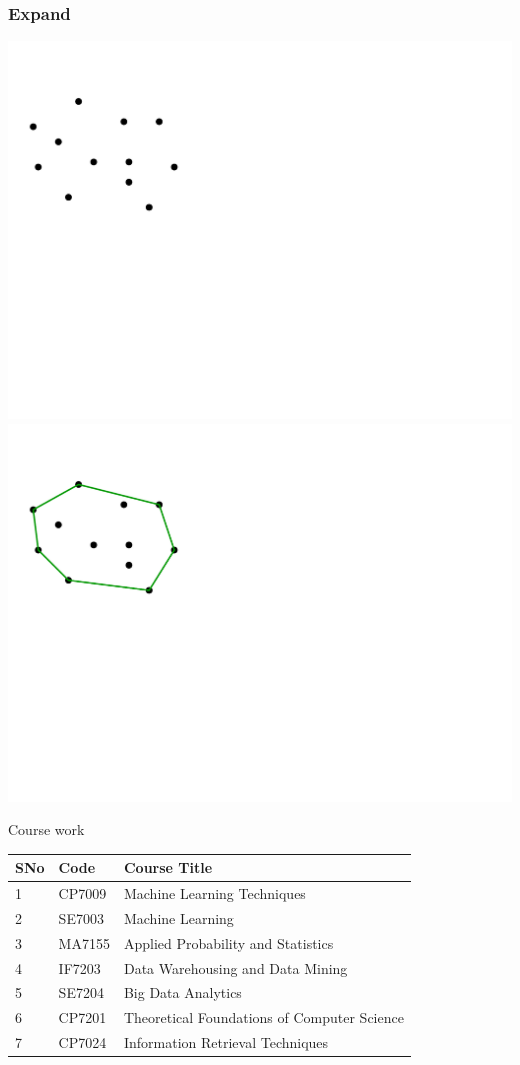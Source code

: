 \documentclass[11pt]{beamer}
\begin{document}
\begin{frame}
  \frametitle{Expand}
  \begin{overprint}[\linewidth]
    \centering \includegraphics[scale=.75]{convex-2-1}
    \centering \includegraphics[scale=.75]{convex-2-2}
  \end{overprint}
\end{frame}


\begin{frame}{Course work}

  \begin{tabular}{lll}
    SNo & Code & Course Title\\\hline
    1 & CP7009 & Machine Learning Techniques\\
    2 & SE7003 & Machine Learning\\
    3 & MA7155 & Applied Probability and Statistics \\    
    4 & IF7203 & Data Warehousing and Data Mining \\
    5 & SE7204 & Big Data Analytics\\
    6 & CP7201 & Theoretical Foundations  of Computer Science\\
    7 & CP7024 & Information Retrieval Techniques \\
  \end{tabular} 
\end{frame}
\end{document}

